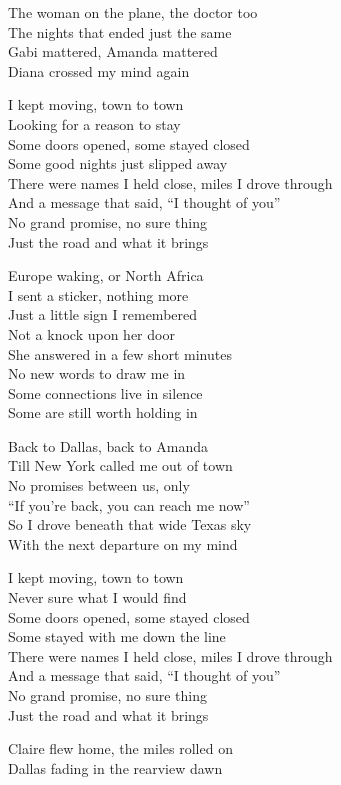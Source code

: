 \begin{lyrics}
The woman on the plane, the doctor too\\
The nights that ended just the same\\
Gabi mattered, Amanda mattered\\
Diana crossed my mind again

I kept moving, town to town\\
Looking for a reason to stay\\
Some doors opened, some stayed closed\\
Some good nights just slipped away\\
There were names I held close, miles I drove through\\
And a message that said, “I thought of you”\\
No grand promise, no sure thing\\
Just the road and what it brings

Europe waking, or North Africa\\
I sent a sticker, nothing more\\
Just a little sign I remembered\\
Not a knock upon her door\\
She answered in a few short minutes\\
No new words to draw me in\\
Some connections live in silence\\
Some are still worth holding in

Back to Dallas, back to Amanda\\
Till New York called me out of town\\
No promises between us, only\\
“If you’re back, you can reach me now”\\
So I drove beneath that wide Texas sky\\
With the next departure on my mind

I kept moving, town to town\\
Never sure what I would find\\
Some doors opened, some stayed closed\\
Some stayed with me down the line\\
There were names I held close, miles I drove through\\
And a message that said, “I thought of you”\\
No grand promise, no sure thing\\
Just the road and what it brings

Claire flew home, the miles rolled on\\
Dallas fading in the rearview dawn
\end{lyrics}

